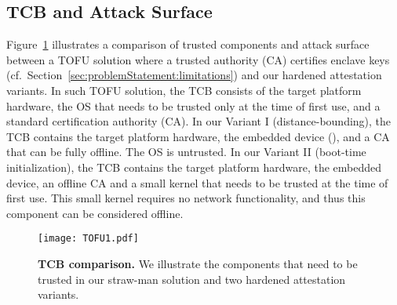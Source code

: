 

\subsection{TCB and Attack Surface}

Figure~\ref{fig:TOFU} illustrates a comparison of trusted components and attack surface between a TOFU solution where a trusted authority (CA) certifies enclave keys (cf.~Section~\ref{sec:problemStatement:limitations}) and our hardened attestation variants. In such TOFU solution, the TCB consists of the target platform hardware, the OS that needs to be trusted only at the time of first use, and a standard certification authority (CA). In our Variant I (distance-bounding), the TCB contains the target platform hardware, the embedded device (\device), and a CA that can be fully offline. The OS is untrusted. In our Variant II (boot-time initialization), the TCB contains the target platform hardware, the embedded device, an offline CA and a small kernel that needs to be trusted at the time of first use. This small kernel requires no network functionality, and thus this component can be considered offline.

\ifusenix
\begin{figure}[t]
 \centering
  \texttt{[image: TOFU1.pdf]}
 \caption{\textbf{TCB comparison.} We illustrate the components that need to be trusted in our straw-man solution and two hardened attestation variants.}
 \vspace{-15px}
 \label{fig:TOFU}
\end{figure}

